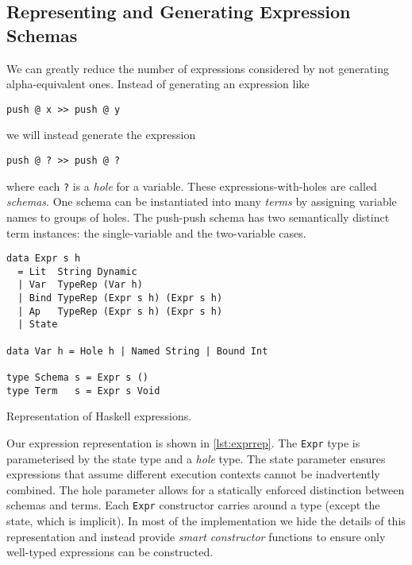 \subsection{Representing and Generating Expression Schemas}
\label{sec:coco-hiw-gen}

We can greatly reduce the number of expressions considered by not
generating alpha-equivalent ones.  Instead of generating an expression
like

\begin{verbatim}
push @ x >> push @ y
\end{verbatim}

\noindent
we will instead generate the expression

\begin{verbatim}
push @ ? >> push @ ?
\end{verbatim}

\noindent
where each \verb|?| is a \emph{hole} for a variable.  These
expressions-with-holes are called \emph{schemas}.  One schema can be
instantiated into many \emph{terms} by assigning variable names to
groups of holes.  The push-push schema has two semantically distinct
term instances: the single-variable and the two-variable cases.

\begin{listing}
\begin{verbatim}
data Expr s h
  = Lit  String Dynamic
  | Var  TypeRep (Var h)
  | Bind TypeRep (Expr s h) (Expr s h)
  | Ap   TypeRep (Expr s h) (Expr s h)
  | State

data Var h = Hole h | Named String | Bound Int

type Schema s = Expr s ()
type Term   s = Expr s Void
\end{verbatim}
\caption{Representation of Haskell expressions.}
\label{lst:exprrep}
\end{listing}

Our expression representation is shown in \cref{lst:exprrep}.  The
\verb|Expr| type is parameterised by the state type and a \emph{hole}
type.  The state parameter ensures expressions that assume different
execution contexts cannot be inadvertently combined.  The hole
parameter allows for a statically enforced distinction between schemas
and terms.  Each \verb|Expr| constructor carries around a type (except
the state, which is implicit).  In most of the implementation we hide
the details of this representation and instead provide \emph{smart
  constructor} functions to ensure only well-typed expressions can be
constructed.

